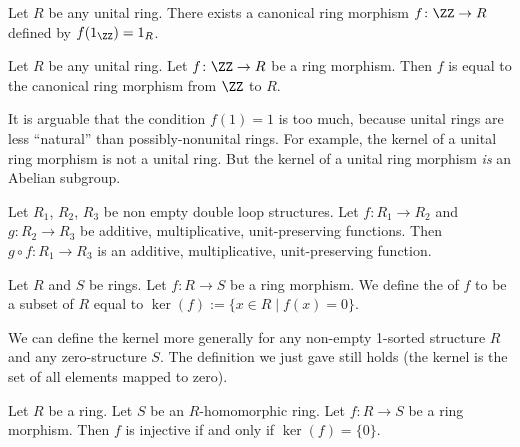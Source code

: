 \begin{example}
Let $R$ be any unital ring. There exists a canonical ring morphism
$f\colon\ZZ\to R$ defined by $f(1_{\ZZ})=1_{R}$.
\end{example}

\earmuffed
\begin{theorem}
Let $R$ be any unital ring.
Let $f\colon\ZZ\to R$ be a ring morphism.
Then $f$ is equal to the canonical ring morphism from $\ZZ$ to $R$.
\end{theorem}

\begin{remark}
It is arguable that the condition $f(1)=1$ is too much, because unital
rings are less ``natural'' than possibly-nonunital rings. For example,
the kernel of a unital ring morphism is not a unital ring. But the
kernel of a unital ring morphism \emph{is} an Abelian subgroup.
\end{remark}

\begin{theorem}
Let $R_{1}$, $R_{2}$, $R_{3}$ be non empty double loop structures.
Let $f\colon R_{1}\to R_{2}$ and $g\colon R_{2}\to R_{3}$ be additive,
multiplicative, unit-preserving functions. Then $g\circ f\colon R_{1}\to R_{3}$
is an additive, multiplicative, unit-preserving function.
\end{theorem}

\begin{definition}
Let $R$ and $S$ be rings. Let $f\colon R\to S$ be a ring morphism.
We define the  of $f$ to be a subset of $R$ equal to
$\ker(f):=\{x\in R\mid f(x)=0\}$.
\end{definition}

\begin{remark}
We can define the kernel more generally for any non-empty 1-sorted
structure $R$ and any zero-structure $S$. The definition we just gave
still holds (the kernel is the set of all elements mapped to zero).
\end{remark}

\begin{theorem}
Let $R$ be a ring. Let $S$ be an $R$-homomorphic ring.
Let $f\colon R\to S$ be a ring morphism.
Then $f$ is injective if and only if $\ker(f)=\{0\}$.
\end{theorem}

